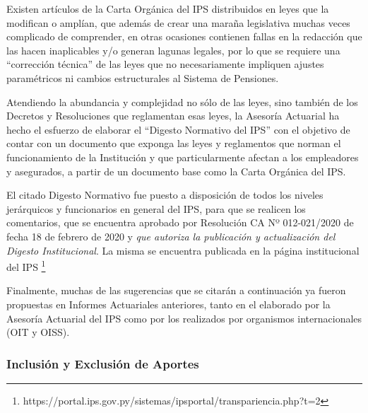 \documentclass[a4paper,11pt]{article}
\begin{document}
Existen artículos de la Carta Orgánica del IPS distribuidos en leyes que la modifican o amplían, que además de crear una maraña legislativa muchas veces complicado de comprender, en otras ocasiones contienen fallas en la redacción que las hacen inaplicables y/o generan lagunas legales, por lo que se requiere una “corrección técnica” de las leyes que no necesariamente impliquen ajustes paramétricos ni cambios estructurales al Sistema de Pensiones.

Atendiendo la abundancia y complejidad no sólo de las leyes, sino también de los Decretos y Resoluciones que reglamentan esas leyes, la Asesoría Actuarial ha hecho el esfuerzo de elaborar el “Digesto Normativo del IPS” con el objetivo de contar con un documento que exponga las leyes y reglamentos que norman el funcionamiento de la Institución y que particularmente afectan a los empleadores y asegurados, a partir de un documento base como la Carta Orgánica del IPS.  

El citado Digesto Normativo fue puesto a disposición de todos los niveles jerárquicos y funcionarios en general del IPS, para que se realicen los comentarios, que se encuentra aprobado por Resolución CA Nº 012-021/2020 de fecha 18 de febrero de 2020 y \textit{que autoriza la publicación y actualización del Digesto Institucional}. La misma se encuentra publicada en la página institucional del IPS \footnote{https://portal.ips.gov.py/sistemas/ipsportal/transpariencia.php?t=2}

Finalmente, muchas de las sugerencias que se citarán a continuación ya fueron propuestas en Informes Actuariales anteriores, tanto en el elaborado por la Asesoría Actuarial del IPS como por los realizados por organismos internacionales (OIT y OISS).

\subsubsection{Inclusión y Exclusión de Aportes}
\end{document}
